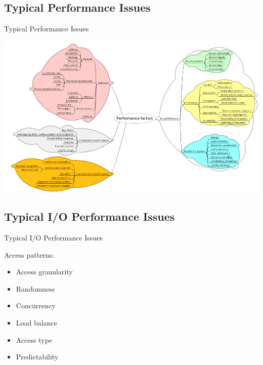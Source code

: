 \documentclass[compress,11pt,xcolor=svgnames,aspectratio=169]{beamer}
\begin{document}
\subsection{Typical Performance Issues}

\begin{frame}[t]{Typical Performance Issues}

\begin{center}
\includegraphics[scale=0.4]{fig/performance-skill-tree}
\end{center}

\nocite{SOPPOAASLK13}

\end{frame}

\subsection{Typical I/O Performance Issues}

\begin{frame}[t]{Typical I/O Performance Issues}

 Access patterns:\nocite{SOPPOAASLK13}

    \begin{itemize}
    \setlength\itemsep{0.3cm}
        \item Access granularity
        \item Randomness
        \item Concurrency
        \item Load balance
        \item Access type
        \item Predictability
    \end{itemize}

\nocite{SOPPOAASLK13}

\end{frame}
\end{document}

